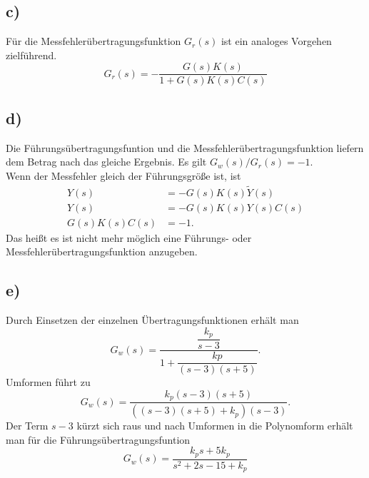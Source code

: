 \documentclass[11pt]{scrartcl} %
\begin{document}
\subsection*{c)}
Für die Messfehlerübertragungsfunktion $G_r(s)$ ist ein analoges Vorgehen zielführend.
\begin{equation*}
G_r(s)=- \dfrac{G(s)K(s)}{1+G(s)K(s)C(s)}
\end{equation*}
\subsection*{d)}
Die Führungsübertragungsfuntion und die Messfehlerübertragungsfunktion liefern dem Betrag nach das gleiche Ergebnis. Es gilt $G_w(s)/G_r(s) = -1$. \\
Wenn der Messfehler gleich der Führungsgröße ist, ist
\begin{align*}
Y(s) &= - G(s)K(s)\tilde{Y}(s)\\
Y(s) &= - G(s)K(s)Y(s)C(s)\\
G(s)K(s)C(s) &= - 1.
\end{align*}
Das heißt es ist nicht mehr möglich eine Führungs- oder Messfehlerübertragungsfunktion anzugeben.
\subsection*{e)}
Durch Einsetzen der einzelnen Übertragungsfunktionen erhält man
\begin{equation*}
G_w(s)=\dfrac{\dfrac{k_p}{s-3}}{1+\dfrac{kp}{\left(s-3\right)\left(s+5\right)}}.
\end{equation*}
Umformen führt zu
\begin{equation*}
G_w(s)=\dfrac{k_p\left(s-3\right)\left(s+5\right)}{\left(\left(s-3\right)\left(s+5\right)+k_p\right)\left(s-3\right)}.
\end{equation*}
Der Term $s-3$ kürzt sich raus und nach Umformen in die Polynomform erhält man für die Führungsübertragungsfuntion
\begin{equation*}
G_w(s)=\dfrac{k_ps+5k_p}{s^2+2s-15+k_p}
\end{equation*}
\end{document}
